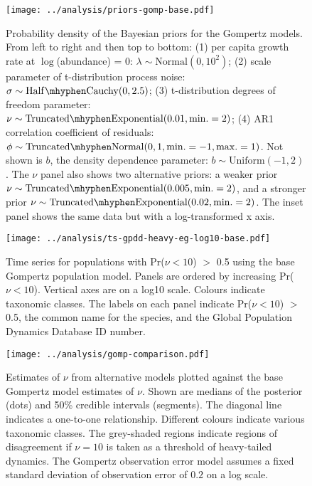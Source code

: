 \clearpage

\begin{figure}[htbp]
\begin{center}
\texttt{[image: ../analysis/priors-gomp-base.pdf]}
\caption{
Probability density of the Bayesian priors for the Gompertz models. From left to right and then top to bottom: (1) per capita growth rate at $\log$(abundance) = $0$: $\lambda \sim \mathrm{Normal}(0, 10^2)$; (2) scale parameter of t-distribution process noise: $\sigma \sim \mathrm{Half\mhyphen Cauchy} (0, 2.5)$; (3) t-distribution degrees of freedom parameter: $\nu \sim \mathrm{Truncated\mhyphen Exponential}(0.01, \mathrm{min.} = 2)$; (4) AR1 correlation coefficient of residuals: $\phi \sim \mathrm{Truncated \mhyphen Normal}(0, 1, \mathrm{min.} = -1, \mathrm{max.} = 1)$. Not shown is $b$, the density dependence parameter: $b \sim \mathrm{Uniform}(-1, 2)$. The $\nu$ panel also shows two alternative priors: a weaker prior $\nu \sim \mathrm{Truncated\mhyphen Exponential}(0.005, \mathrm{min.} = 2)$, and a stronger prior $\nu \sim \mathrm{Truncated\mhyphen Exponential}(0.02, \mathrm{min.} = 2)$. The inset panel shows the same data but with a log-transformed x axis.
}
\label{fig:priors}
\end{center}
\end{figure}

\clearpage

\begin{figure}[htbp]
\begin{center}
\texttt{[image: ../analysis/ts-gpdd-heavy-eg-log10-base.pdf]}
\caption{
  Time series for populations with Pr($\nu < 10$) $>$ 0.5 using the base
  Gompertz population model. Panels are ordered by increasing Pr($\nu < 10$).
  Vertical axes are on a log10 scale. Colours indicate taxonomic classes. The
  labels on each panel indicate Pr($\nu < 10$) $>$ 0.5, the common name for the
  species, and the Global Population Dynamics Database ID number.
}
\label{fig:heavy-ts}
\end{center}
\end{figure}

\clearpage

\begin{figure}[htbp]
\begin{center}
\texttt{[image: ../analysis/gomp-comparison.pdf]}
\caption{
  Estimates of $\nu$ from alternative models plotted against the base Gompertz
  model estimates of $\nu$. Shown are medians of the posterior (dots) and 50\%
  credible intervals (segments). The diagonal line indicates a one-to-one
  relationship. Different colours indicate various taxonomic classes. The
  grey-shaded regions indicate regions of disagreement if $\nu = 10$ is taken
  as a threshold of heavy-tailed dynamics. The Gompertz observation error model
  assumes a fixed standard deviation of observation error of $0.2$ on a log
  scale.
}
\label{fig:alt}
\end{center}
\end{figure}

